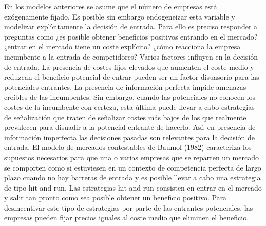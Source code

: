 \documentclass{nuevotema}
\begin{document}
En los modelos anteriores se asume que el número de empresas está exógenamente fijado. Es posible sin embargo endogeneizar esta variable y modelizar explícitamente la \underline{decisión de entrada}. Para ello es preciso responder a preguntas como ¿es posible obtener beneficios positivos entrando en el mercado? ¿entrar en el mercado tiene un coste explícito? ¿cómo reacciona la empresa incumbente a la entrada de competidores? Varios factores influyen en la decisión de entrada. La presencia de costes fijos elevados que aumenten el coste medio y reduzcan el beneficio potencial de entrar pueden ser un factor disuasorio para las potenciales entrantes. La presencia de información perfecta impide amenazas creíbles de las incumbentes. Sin embargo, cuando las potenciales no conocen los costes de la incumbente con certeza, esta última puede llevar a cabo estrategias de señalización que traten de señalizar costes más bajos de los que realmente prevalecen para disuadir a la potencial entrante de hacerlo. Así, en presencia de información imperfecta las decisiones pasadas son relevantes para la decisión de entrada. El modelo de mercados contestables de Baumol (1982) caracteriza los supuestos necesarios para que una o varias empresas que se reparten un mercado se comporten como si estuviesen en un contexto de competencia perfecta de largo plazo cuando no hay barreras de entrada y es posible llevar a cabo una estrategia de tipo hit-and-run. Las estrategias hit-and-run consisten en entrar en el mercado y salir tan pronto como sea posible obtener un beneficio positivo. Para desincentivar este tipo de estrategias por parte de las entrantes potenciales, las empresas pueden fijar precios iguales al coste medio que eliminen el beneficio. 
\end{document}
